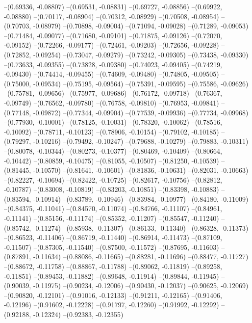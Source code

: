 --(0.69336, -0.08807)
--(0.69531, -0.08831)
--(0.69727, -0.08856)
--(0.69922, -0.08880)
--(0.70117, -0.08904)
--(0.70312, -0.08929)
--(0.70508, -0.08954)
--(0.70703, -0.08979)
--(0.70898, -0.09004)
--(0.71094, -0.09028)
--(0.71289, -0.09053)
--(0.71484, -0.09077)
--(0.71680, -0.09101)
--(0.71875, -0.09126)
--(0.72070, -0.09152)
--(0.72266, -0.09177)
--(0.72461, -0.09203)
--(0.72656, -0.09228)
--(0.72852, -0.09254)
--(0.73047, -0.09279)
--(0.73242, -0.09305)
--(0.73438, -0.09330)
--(0.73633, -0.09355)
--(0.73828, -0.09380)
--(0.74023, -0.09405)
--(0.74219, -0.09430)
--(0.74414, -0.09455)
--(0.74609, -0.09480)
--(0.74805, -0.09505)
--(0.75000, -0.09534)
--(0.75195, -0.09564)
--(0.75391, -0.09595)
--(0.75586, -0.09626)
--(0.75781, -0.09656)
--(0.75977, -0.09686)
--(0.76172, -0.09718)
--(0.76367, -0.09749)
--(0.76562, -0.09780)
--(0.76758, -0.09810)
--(0.76953, -0.09841)
--(0.77148, -0.09872)
--(0.77344, -0.09904)
--(0.77539, -0.09936)
--(0.77734, -0.09968)
--(0.77930, -0.10001)
--(0.78125, -0.10031)
--(0.78320, -0.10062)
--(0.78516, -0.10092)
--(0.78711, -0.10123)
--(0.78906, -0.10154)
--(0.79102, -0.10185)
--(0.79297, -0.10216)
--(0.79492, -0.10247)
--(0.79688, -0.10279)
--(0.79883, -0.10311)
--(0.80078, -0.10344)
--(0.80273, -0.10377)
--(0.80469, -0.10409)
--(0.80664, -0.10442)
--(0.80859, -0.10475)
--(0.81055, -0.10507)
--(0.81250, -0.10539)
--(0.81445, -0.10570)
--(0.81641, -0.10601)
--(0.81836, -0.10631)
--(0.82031, -0.10663)
--(0.82227, -0.10694)
--(0.82422, -0.10725)
--(0.82617, -0.10756)
--(0.82812, -0.10787)
--(0.83008, -0.10819)
--(0.83203, -0.10851)
--(0.83398, -0.10883)
--(0.83594, -0.10914)
--(0.83789, -0.10946)
--(0.83984, -0.10977)
--(0.84180, -0.11009)
--(0.84375, -0.11041)
--(0.84570, -0.11074)
--(0.84766, -0.11107)
--(0.84961, -0.11141)
--(0.85156, -0.11174)
--(0.85352, -0.11207)
--(0.85547, -0.11240)
--(0.85742, -0.11274)
--(0.85938, -0.11307)
--(0.86133, -0.11340)
--(0.86328, -0.11373)
--(0.86523, -0.11406)
--(0.86719, -0.11440)
--(0.86914, -0.11473)
--(0.87109, -0.11507)
--(0.87305, -0.11540)
--(0.87500, -0.11572)
--(0.87695, -0.11603)
--(0.87891, -0.11634)
--(0.88086, -0.11665)
--(0.88281, -0.11696)
--(0.88477, -0.11727)
--(0.88672, -0.11758)
--(0.88867, -0.11788)
--(0.89062, -0.11819)
--(0.89258, -0.11851)
--(0.89453, -0.11882)
--(0.89648, -0.11914)
--(0.89844, -0.11945)
--(0.90039, -0.11975)
--(0.90234, -0.12006)
--(0.90430, -0.12037)
--(0.90625, -0.12069)
--(0.90820, -0.12101)
--(0.91016, -0.12133)
--(0.91211, -0.12165)
--(0.91406, -0.12196)
--(0.91602, -0.12228)
--(0.91797, -0.12260)
--(0.91992, -0.12292)
--(0.92188, -0.12324)
--(0.92383, -0.12355)
